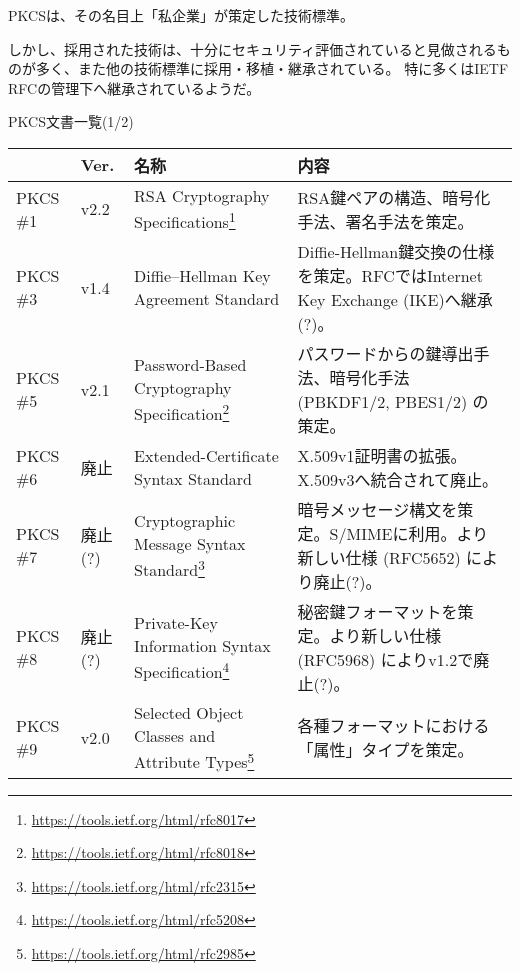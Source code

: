 \documentclass[12pt,dvipdfmx]{beamer}
\begin{document}
\begin{frame}
PKCSは、その名目上「私企業」が策定した技術標準。

しかし、採用された技術は、十分にセキュリティ評価されていると見做されるものが多く、また他の技術標準に採用・移植・継承されている。
特に多くはIETF RFCの管理下へ継承されているようだ。
\end{frame}

\begin{frame}
PKCS文書一覧(1/2)
\begin{table}
\scriptsize
\begin{tabular}{|l|l|p{21ex}|p{40ex}|}
\hline
 & Ver. & 名称 & 内容 \\
\hline\hline
PKCS \#1 & v2.2 & RSA Cryptography Specifications\footnote[frame]{\scriptsize \url{https://tools.ietf.org/html/rfc8017}} & RSA鍵ペアの構造、暗号化手法、署名手法を策定。\\
\hline
PKCS \#3 & v1.4 & Diffie–Hellman Key Agreement Standard & Diffie-Hellman鍵交換の仕様を策定。RFCではInternet Key Exchange (IKE)へ継承(?)。\\
\hline
PKCS \#5 & v2.1 & Password-Based Cryptography Specification\footnote[frame]{\scriptsize \url{https://tools.ietf.org/html/rfc8018}} & パスワードからの鍵導出手法、暗号化手法 (PBKDF1/2, PBES1/2) の策定。\\
\hline
PKCS \#6 & 廃止 & Extended-Certificate Syntax Standard & X.509v1証明書の拡張。X.509v3へ統合されて廃止。\\
\hline
PKCS \#7 & 廃止(?) & Cryptographic Message Syntax Standard\footnote[frame]{\scriptsize \url{https://tools.ietf.org/html/rfc2315}} & 暗号メッセージ構文を策定。S/MIMEに利用。より新しい仕様 (RFC5652) により廃止(?)。\\
\hline
PKCS \#8 & 廃止(?) & Private-Key Information Syntax Specification\footnote[frame]{\scriptsize \url{https://tools.ietf.org/html/rfc5208}} & 秘密鍵フォーマットを策定。より新しい仕様 (RFC5968) によりv1.2で廃止(?)。\\
\hline
PKCS \#9 & v2.0 & Selected Object Classes and Attribute Types\footnote[frame]{\scriptsize \url{https://tools.ietf.org/html/rfc2985}} & 各種フォーマットにおける「属性」タイプを策定。\\
\hline
\end{tabular}
\end{table}
\end{frame}
\end{document}
